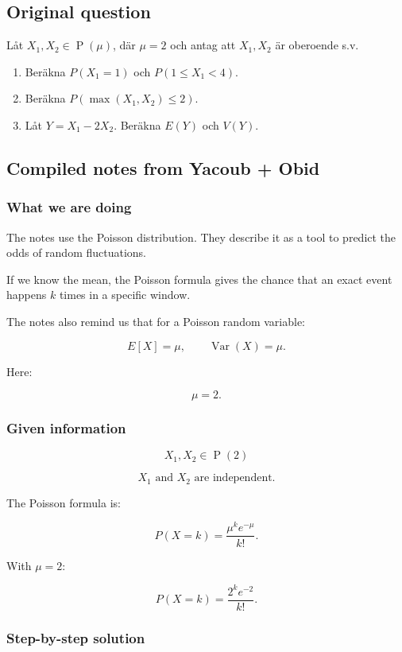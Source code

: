 \documentclass[10pt]{article}
\begin{document}
\subsection*{Original question}
Låt $X_1,X_2\in \operatorname{P}(\mu)$, där $\mu=2$ och antag att
$X_1,X_2$ är oberoende s.v.

\begin{enumerate}[label=\alph*)]
\item
Beräkna $P(X_1=1)$ och $P(1\leq X_1<4)$.

\item
Beräkna $P(\max(X_1,X_2)\leq 2)$.

\item
Låt $Y=X_1-2X_2$. Beräkna $E(Y)$ och $V(Y)$.
\end{enumerate}

\subsection*{Compiled notes from Yacoub + Obid}

\subsubsection*{What we are doing}
The notes use the Poisson distribution.
They describe it as a tool to predict the odds of random
fluctuations.

If we know the mean, the Poisson formula gives the chance that
an exact event happens $k$ times in a specific window.

The notes also remind us that for a Poisson random variable:

\[
E[X]=\mu,
\qquad
\operatorname{Var}(X)=\mu.
\]

Here:

\[
\mu=2.
\]

\subsubsection*{Given information}
\[
X_1,X_2\in \operatorname{P}(2)
\]

\[
X_1 \text{ and } X_2
\text{ are independent.}
\]

The Poisson formula is:

\[
P(X=k)=
\frac{\mu^k e^{-\mu}}{k!}.
\]

With $\mu=2$:

\[
P(X=k)=
\frac{2^k e^{-2}}{k!}.
\]

\subsubsection*{Step-by-step solution}
\end{document}

